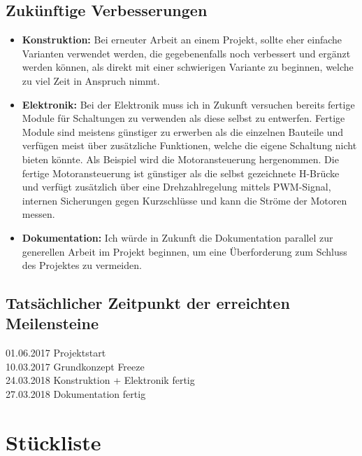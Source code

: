 \subsection{Zukünftige Verbesserungen}
\begin{itemize}
\item \textbf{Konstruktion:} Bei erneuter Arbeit an einem Projekt, sollte eher einfache Varianten verwendet werden, die gegebenenfalls noch verbessert und ergänzt werden können, als direkt mit einer schwierigen Variante zu beginnen, welche zu viel Zeit in Anspruch nimmt.
\item \textbf{Elektronik:} Bei der Elektronik muss ich in Zukunft versuchen bereits fertige Module für Schaltungen zu verwenden als diese selbst zu entwerfen. Fertige Module sind meistens günstiger zu erwerben als die einzelnen Bauteile und verfügen meist über zusätzliche Funktionen, welche die eigene Schaltung nicht bieten könnte. Als Beispiel wird die Motoransteuerung hergenommen. Die fertige Motoransteuerung ist günstiger als die selbst gezeichnete H-Brücke und verfügt zusätzlich über eine Drehzahlregelung mittels PWM-Signal, internen Sicherungen gegen Kurzschlüsse und kann die Ströme der Motoren messen.
\item \textbf{Dokumentation:} Ich würde in Zukunft die Dokumentation parallel zur generellen Arbeit im Projekt beginnen, um eine Überforderung zum Schluss des Projektes zu vermeiden.
\end{itemize}
\subsection{Tatsächlicher Zeitpunkt der erreichten Meilensteine}
01.06.2017 Projektstart\\

10.03.2017 Grundkonzept Freeze\\

24.03.2018 Konstruktion + Elektronik fertig\\

27.03.2018 Dokumentation fertig\\
\section{Stückliste}

